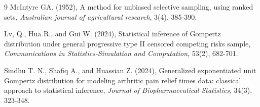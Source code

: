 \documentclass[twoside]{article}
\begin{document}
\begin{thebibliography}{9}
McIntyre GA. (1952), A method for unbiased selective sampling, using ranked sets, {\it Australian journal of agricultural research}, 3(4), 385-390.

Lv, Q., Hua R., and Gui W. (2024), Statistical inference of Gompertz distribution under general progressive type II censored competing risks sample, {\it Communications in Statistics-Simulation and Computation}, 53(2), 682-701.

Sindhu T. N., Shafiq A., and Huassian Z. (2024), Generalized exponentiated unit Gompertz distribution for modeling arthritic pain relief times data: classical approach to statistical inference, {\it Journal of Biopharmaceutical Statistics}, 34(3), 323-348.

\end{thebibliography}
 
\end{document}
